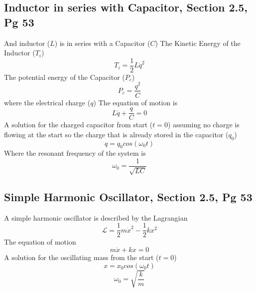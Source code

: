 \documentclass[12pt]{article}
\begin{document}
    \subsection{Inductor in series with Capacitor, Section 2.5, Pg 53}
    And inductor ($L$) is in series with a Capacitor ($C$)
    The Kinetic Energy of the Inductor ($T_i$)
    \begin{equation}
        T_i = \frac{1}{2} L \dot{q}^2
    \end{equation}
    The potential energy of the Capacitor ($P_c$)
    \begin{equation}
        P_c = \frac{q^2}{C}
    \end{equation}
    where the electrical charge ($q$)
    The equation of motion is
    \begin{equation}
        L \ddot{q} + \frac{q}{C} = 0
    \end{equation}
    A solution for the charged capacitor from start ($t=0$) assuming no charge is flowing at the start so the charge that is already stored in the capacitor ($q_0$)
    \begin{equation}
        q = q_0 cos(\omega_0 t)
    \end{equation}
    Where the resonant frequency of the system is
    \begin{equation}
        \omega_0 = \frac{1}{\sqrt{L C}}
    \end{equation}

    \subsection{Simple Harmonic Oscillator, Section 2.5, Pg 53}
    A simple harmonic oscillator is described by the Lagrangian
    \begin{equation}
        \mathcal{L} = \frac{1}{2} m \dot{x}^2 - \frac{1}{2} k x^2
    \end{equation}
    The equation of motion 
    \begin{equation}
        m \ddot{x} + k x = 0
    \end{equation}
    A solution for the oscillating mass from the start ($t=0$)
    \begin{equation}
        x = x_0 cos(\omega_0 t)
    \end{equation}
    \begin{equation}
        \omega_0 = \sqrt{\frac{k}{m}}
    \end{equation}
\end{document}
